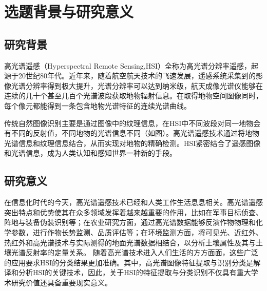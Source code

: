 \section{ 选题背景与研究意义}
\subsection{研究背景}
高光谱遥感（Hyperspectral Remote Sensing,HSI）全称为高光谱分辨率遥感，起源于20世纪80年代。近年来，随着航空航天技术的飞速发展，遥感系统采集到的影像光谱分辨率得到极大提升，光谱分辨率可以达到纳米级，航天成像光谱仪能够在连续的几十个甚至几百个光谱波段获取地物辐射信息。在取得地物空间图像同时，每个像元都能得到一条包含地物光谱特征的连续光谱曲线。

传统自然图像识别主要是通过图像中的纹理信息，在HSI中不同波段对同一地物会有不同的反射值，不同地物的光谱信息不同（如图）。高光谱遥感技术通过将地物光谱信息和纹理信息结合，从而实现对地物的精确检测。HSI紧密结合了遥感图像和光谱信息，成为人类认知和感知世界一种新的手段。

\subsection{ 研究意义}

在信息化时代的今天，高光谱遥感技术已经和人类工作生活息息相关。高光谱遥感突出特点和优势使其在众多领域发挥着越来越重要的作用，比如在军事目标侦查、阵地与装备伪装识别等\cite{yang2017}；在农业研究方面，通过高光谱数据能够反演作物物理和化学参数，进行作物长势监测、品质评估等\cite{liu2020}；在环境监测方面，将可见光、近红外、热红外和高光谱技术与实际测得的地面光谱数据相结合，以分析土壤属性及其与土壤光谱反射率的定量关系\cite{tian2019}。
随着高光谱技术进入人们生活的方方面面，这些广泛的应用要求HSI的分类结果更加准确。其中，高光谱图像特征提取与识别分类是解译和分析HSI的关键技术，因此，关于HSI的特征提取与分类识别不仅具有重大学术研究价值还具备重要现实意义。